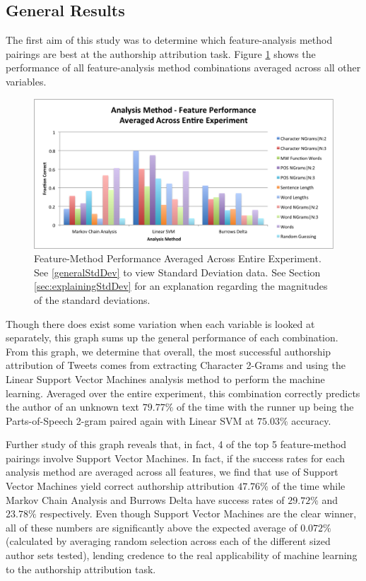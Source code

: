\documentclass[pageno]{jpaper}
\begin{document}
\subsection{General Results}
\label{sec:generalResults}
The first aim of this study was to determine which feature-analysis method pairings are best at the authorship attribution task.  Figure \ref{fig:GeneralResults} shows the performance of all feature-analysis method combinations averaged across all other variables.  
\begin{figure}[h!]
\begin{center}
\includegraphics*[scale=.85]{GeneralFeatureMethodResults}
\end{center}
\caption{Feature-Method Performance Averaged Across Entire Experiment.  See \ref{generalStdDev} to view Standard Deviation data.  See Section \ref{sec:explainingStdDev} for an explanation regarding the magnitudes of the standard deviations.}
\label{fig:GeneralResults}
\end{figure}
Though there does exist some variation when each variable is looked at separately, this graph sums up the general performance of each combination.  From this graph, we determine that overall, the most successful authorship attribution of Tweets comes from extracting Character 2-Grams and using the Linear Support Vector Machines analysis method to perform the machine learning.  Averaged over the entire experiment, this combination correctly predicts the author of an unknown text $79.77\%$ of the time with the runner up being the Parts-of-Speech 2-gram paired again with Linear SVM at $75.03\%$ accuracy.  

Further study of this graph reveals that, in fact, 4 of the top 5 feature-method pairings involve Support Vector Machines.  In fact, if the success rates for each analysis method are averaged across all features, we find that use of Support Vector Machines yield correct authorship attribution $47.76\%$ of the time while Markov Chain Analysis and Burrows Delta have success rates of $29.72\%$ and $23.78\%$ respectively.  Even though Support Vector Machines are the clear winner, all of these numbers are significantly above the expected average of $0.072\%$ (calculated by averaging random selection across each of the different sized author sets tested), lending credence to the real applicability of machine learning to the authorship attribution task.
\end{document}
